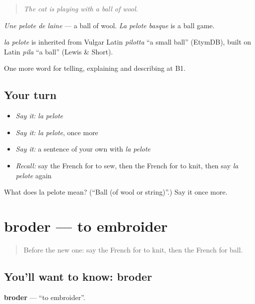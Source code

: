 \begin{quote}
\emph{The cat is playing with a ball of wool.}
\end{quote}

\emph{Une pelote de laine} — a ball of wool. \emph{La pelote basque} is a ball game.

\begin{cousinweb}
\emph{la pelote} is inherited from Vulgar Latin \emph{pilotta} \textquotedblleft{}a small ball\textquotedblright{} (EtymDB), built on Latin \emph{pila} \textquotedblleft{}a ball\textquotedblright{} (Lewis \& Short).
\end{cousinweb}

\begin{grammarlens}[title={What you've built}]
One more word for telling, explaining and describing at B1.
\end{grammarlens}

\subsection*{Your turn}
\begin{itemize}
\raggedright
  \item \emph{Say it:} \emph{la pelote}
  \item \emph{Say it:} \emph{la pelote}, once more
  \item \emph{Say it:} a sentence of your own with \emph{la pelote}
  \item \emph{Recall:} say the French for to sew, then the French for to knit, then say \emph{la pelote} again
\end{itemize}

\begin{tcolorbox}[breakable,colback=teal!4,colframe=teal!35!black,title={Before you move on}]
What does la pelote mean? (\textquotedblleft{}Ball (of wool or string)\textquotedblright{}.) Say it once more.
\end{tcolorbox}
\section[broder]{broder — to embroider}

\label{lesson:FR-C496-broder}



\begin{quote}
Before the new one: say the French for to knit, then the French for ball.
\end{quote}

\subsection*{You'll want to know: broder}
\textbf{broder} — \textquotedblleft{}to embroider\textquotedblright{}.


